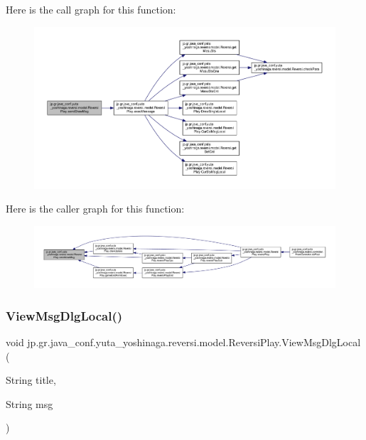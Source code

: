 Here is the call graph for this function\+:
\nopagebreak
\begin{figure}[H]
\begin{center}
\leavevmode
\includegraphics[width=350pt]{classjp_1_1gr_1_1java__conf_1_1yuta__yoshinaga_1_1reversi_1_1model_1_1_reversi_play_a93ebdb5fb7097984730a85f62ebb57d7_cgraph}
\end{center}
\end{figure}
Here is the caller graph for this function\+:
\nopagebreak
\begin{figure}[H]
\begin{center}
\leavevmode
\includegraphics[width=350pt]{classjp_1_1gr_1_1java__conf_1_1yuta__yoshinaga_1_1reversi_1_1model_1_1_reversi_play_a93ebdb5fb7097984730a85f62ebb57d7_icgraph}
\end{center}
\end{figure}
\mbox{\label{classjp_1_1gr_1_1java__conf_1_1yuta__yoshinaga_1_1reversi_1_1model_1_1_reversi_play_ae673231f92f3bd36a43acbc713a97513}} 
\subsubsection{\texorpdfstring{View\+Msg\+Dlg\+Local()}{ViewMsgDlgLocal()}}
{\footnotesize\ttfamily void jp.\+gr.\+java\+\_\+conf.\+yuta\+\_\+yoshinaga.\+reversi.\+model.\+Reversi\+Play.\+View\+Msg\+Dlg\+Local (\begin{DoxyParamCaption}\item[{String}]{title,  }\item[{String}]{msg }\end{DoxyParamCaption})\hspace{0.3cm}{\ttfamily [private]}}



